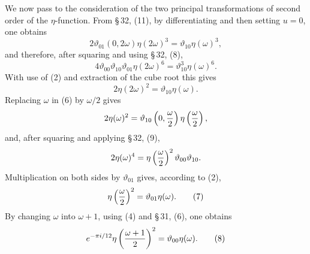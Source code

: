 \documentclass[11pt]{article}
\providecommand{\tht}{\vartheta}
\begin{document}
We now pass to the consideration of the two principal transformations of second order of the $\eta$-function. From \S\,32, (11), by differentiating and then setting $u=0$, one obtains
\[
2\tht_{01}(0,2\omega)\eta(2\omega)^3=\tht_{10}\eta(\omega)^3,
\]
and therefore, after squaring and using \S\,32, (8),
\[
4\tht_{00}\tht_{10}\tht_{01}\eta(2\omega)^6=\tht_{10}^3\eta(\omega)^6.
\]
With use of (2) and extraction of the cube root this gives
\begin{equation}
2\eta(2\omega)^2=\tht_{10}\eta(\omega). \tag{6}
\end{equation}
Replacing $\omega$ in (6) by $\omega/2$ gives
\[
2\eta(\omega)^2=\tht_{10}\left(0,{\omega\over2}\right)\eta\left({\omega\over2}\right),
\]
and, after squaring and applying \S\,32, (9),
\[
2\eta(\omega)^4=\eta\left({\omega\over2}\right)^2\tht_{00}\tht_{10}.
\]
Multiplication on both sides by $\tht_{01}$ gives, according to (2),
\begin{equation}
\eta\left({\omega\over2}\right)^2=\tht_{01}\eta(\omega). \tag{7}
\end{equation}
By changing $\omega$ into $\omega+1$, using (4) and \S\,31, (6), one obtains
\begin{equation}
e^{-\pi i/12}\eta\left({\omega+1\over2}\right)^2=\tht_{00}\eta(\omega). \tag{8}
\end{equation}
\end{document}
